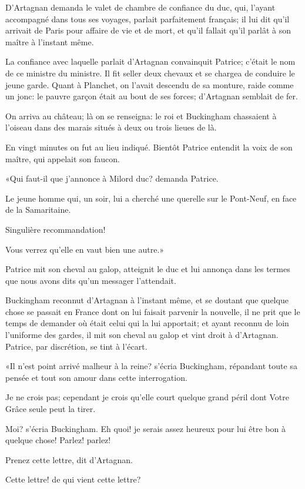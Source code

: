 D'Artagnan demanda le valet de chambre de confiance du duc, qui, l'ayant accompagné dans tous ses voyages, parlait parfaitement français; il lui dit qu'il arrivait de Paris pour affaire de vie et de mort, et qu'il fallait qu'il parlât à son maître à l'instant même. 

La confiance avec laquelle parlait d'Artagnan convainquit Patrice; c'était le nom de ce ministre du ministre. Il fit seller deux chevaux et se chargea de conduire le jeune garde. Quant à Planchet, on l'avait descendu de sa monture, raide comme un jonc: le pauvre garçon était au bout de ses forces; d'Artagnan semblait de fer. 

On arriva au château; là on se renseigna: le roi et Buckingham chassaient à l'oiseau dans des marais situés à deux ou trois lieues de là. 

En vingt minutes on fut au lieu indiqué. Bientôt Patrice entendit la voix de son maître, qui appelait son faucon. 

«Qui faut-il que j'annonce à Milord duc? demanda Patrice. 

\speak  Le jeune homme qui, un soir, lui a cherché une querelle sur le Pont-Neuf, en face de la Samaritaine. 

\speak  Singulière recommandation! 

\speak  Vous verrez qu'elle en vaut bien une autre.» 

Patrice mit son cheval au galop, atteignit le duc et lui annonça dans les termes que nous avons dits qu'un messager l'attendait. 

Buckingham reconnut d'Artagnan à l'instant même, et se doutant que quelque chose se passait en France dont on lui faisait parvenir la nouvelle, il ne prit que le temps de demander où était celui qui la lui apportait; et ayant reconnu de loin l'uniforme des gardes, il mit son cheval au galop et vint droit à d'Artagnan. Patrice, par discrétion, se tint à l'écart. 

«Il n'est point arrivé malheur à la reine? s'écria Buckingham, répandant toute sa pensée et tout son amour dans cette interrogation. 

\speak  Je ne crois pas; cependant je crois qu'elle court quelque grand péril dont Votre Grâce seule peut la tirer. 

\speak  Moi? s'écria Buckingham. Eh quoi! je serais assez heureux pour lui être bon à quelque chose! Parlez! parlez! 

\speak  Prenez cette lettre, dit d'Artagnan. 

\speak  Cette lettre! de qui vient cette lettre? 

